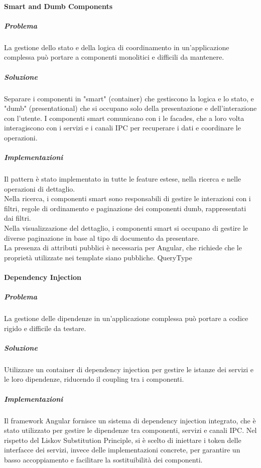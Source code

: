     \paragraph{Smart and Dumb Components}
    \subparagraph{Problema}
        La gestione dello stato e della logica di coordinamento in un'applicazione complessa può portare a componenti monolitici e difficili da mantenere.
    \subparagraph{Soluzione}
        Separare i componenti in "smart" (container) che gestiscono la logica e lo stato, e "dumb" (presentational) che si occupano solo della presentazione e dell'interazione con l'utente. I componenti smart comunicano con i le facades, che a loro volta interagiscono con i servizi e i canali IPC per recuperare i dati e coordinare le operazioni.
    \subparagraph{Implementazioni}
        Il pattern è stato implementato in tutte le feature estese, nella ricerca e nelle operazioni di dettaglio. \\
        Nella ricerca, i componenti smart sono responsabili di gestire le interazioni con i filtri, regole di ordinamento e paginazione dei componenti dumb, rappresentati dai filtri.
        \\ Nella visualizzazione del dettaglio, i componenti smart si occupano di gestire le diverse paginazione in base al tipo di documento da presentare.
        \\ La presenza di attributi pubblici è necessaria per Angular, che richiede che le proprietà utilizzate nei template siano pubbliche.
QueryType
    \paragraph{Dependency Injection}
    \subparagraph{Problema}
        La gestione delle dipendenze in un'applicazione complessa può portare a codice rigido e difficile da testare.
    \subparagraph{Soluzione}
        Utilizzare un container di dependency injection per gestire le istanze dei servizi e le loro dipendenze, riducendo il coupling tra i componenti.
    \subparagraph{Implementazioni}
        Il framework Angular fornisce un sistema di dependency injection integrato, che è stato utilizzato per gestire le dipendenze tra componenti, servizi e canali IPC.
        Nel rispetto del Liskov Substitution Principle, si è scelto di iniettare i token delle interfacce dei servizi, invece delle implementazioni concrete, per garantire un basso accoppiamento e facilitare la sostituibilità dei componenti.

